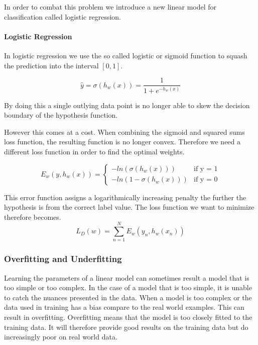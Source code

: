 In order to combat this problem we introduce a new linear model for classification called logistic regression.

\paragraph{Logistic Regression}\label{sec:logistic}

In logistic regression we use the so called logistic or sigmoid function to squash the prediction into the interval $[0,1]$.

\[ \hat{y} = \sigma(h_w(x)) = \frac{1}{1+e^{-h_w(x)}} \]

By doing this a single outlying data point is no longer able to skew the decision boundary of the hypothesis function.

However this comes at a cost.
When combining the sigmoid and squared sums loss function, the resulting function is no longer convex.
Therefore we need a different loss function in order to find the optimal weights.

$$E_w(y,h_w(x)) = \begin{cases}
	-ln(\sigma(h_w(x))) &\text{if y = 1}\\	
	-ln(1-\sigma(h_w(x))) &\text{if y = 0}
\end{cases}$$

This error function assigns a logarithmically increasing penalty the further the hypothesis is from the correct label value.
The loss function we want to minimize therefore becomes. 
$$L_D(w) = \sum_{n=1}^N E_w(y_n, h_w(x_n))$$ 

\subsubsection{Overfitting and Underfitting}
Learning the parameters of a linear model can sometimes result a model that is too simple or too complex.
In the case of a model that is too simple, it is unable to catch the nuances presented in the data.
When a model is too complex or the data used in training has a bias compare to the real world examples.
This can result in overfitting.
Overfitting means that the model is too closely fitted to the training data.
It will therefore provide good results on the training data but do increasingly poor on real world data.

